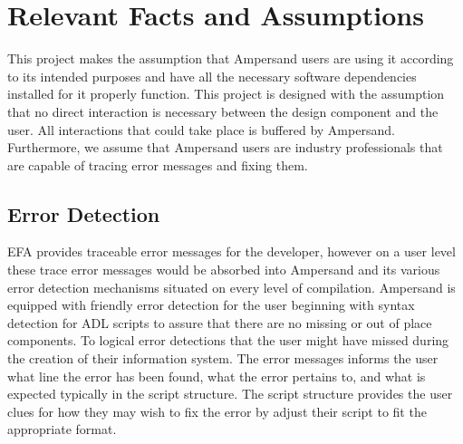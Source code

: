 \documentclass[12pt]{report}
\begin{document}
\section{Relevant Facts and Assumptions}\label{sec:Assumptions}
This project makes the assumption that Ampersand users are using it according 
to its intended purposes and have all the necessary software dependencies 
installed for it properly function. This project is designed with the 
assumption that no direct interaction is necessary between the design component 
and the user. 
All interactions that could take place is buffered by Ampersand. 
Furthermore, we assume that Ampersand users are industry professionals that are 
capable of tracing error messages and fixing them. 

\subsection{Error Detection}
EFA provides traceable error messages for the developer, however on a user 
level these trace error messages would be absorbed into Ampersand and its 
various error detection mechanisms situated on every level of compilation. 
Ampersand is equipped with friendly error detection 
for the user beginning with 
syntax detection for ADL scripts to assure that there are no missing or out of 
place components. To logical error detections that the user might have missed 
during the creation of their information system. 
The error messages informs the 
user what line the error has been found, what the error pertains to, and what 
is expected typically in the script structure. The script structure provides 
the user clues for how they may wish to fix the error by adjust their script to 
fit the appropriate format.

\end{document}
